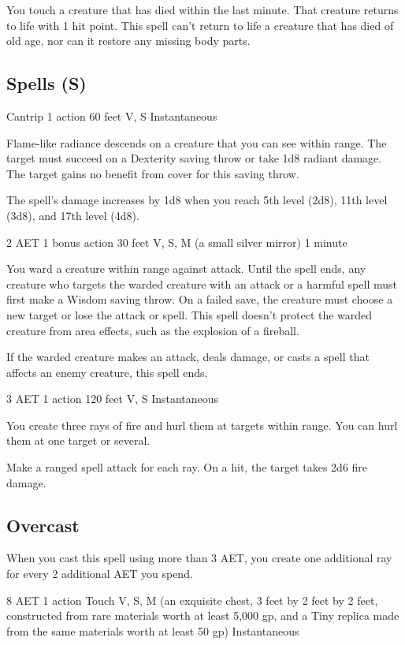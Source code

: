 You touch a creature that has died within the last minute. That creature returns to life with 1 hit point. This spell can't return to life a creature that has died of old age, nor can it restore any missing body parts.

\subsection{Spells (S)}

{Cantrip}
{1 action}
{60 feet}
{V, S}
{Instantaneous}

Flame-like radiance descends on a creature that you can see within range. The target must succeed on a Dexterity saving throw or take 1d8 radiant damage. The target gains no benefit from cover for this saving throw.

The spell's damage increases by 1d8 when you reach 5th level (2d8), 11th level (3d8), and 17th level (4d8).

{2 AET}
{1 bonus action}
{30 feet}
{V, S, M (a small silver mirror)}
{1 minute}

You ward a creature within range against attack. Until the spell ends, any creature who targets the warded creature with an attack or a harmful spell must first make a Wisdom saving throw. On a failed save, the creature must choose a new target or lose the attack or spell. This spell doesn't protect the warded creature from area effects, such as the explosion of a fireball.

If the warded creature makes an attack, deals damage, or casts a spell that affects an enemy creature, this spell ends.

{3 AET}
{1 action}
{120 feet}
{V, S}
{Instantaneous}

You create three rays of fire and hurl them at targets within range. You can hurl them at one target or several.

Make a ranged spell attack for each ray. On a hit, the target takes 2d6 fire damage.

\subsection*{Overcast} When you cast this spell using more than 3 AET, you create one additional ray for every 2 additional AET you spend.

{8 AET}
{1 action}
{Touch}
{V, S, M (an exquisite chest, 3 feet by 2 feet by 2 feet, constructed from rare materials worth at least 5,000 gp, and a Tiny replica made from the same materials worth at least 50 gp)}
{Instantaneous}

